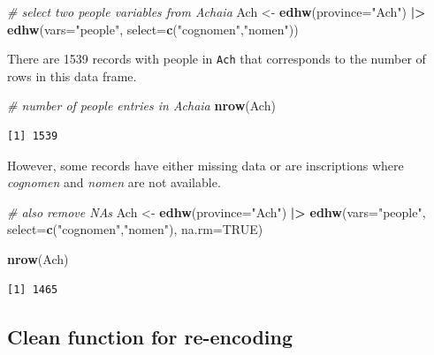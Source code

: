 \documentclass[a4paper,11pt]{memoir}
\newenvironment{Shaded}{\begin{snugshade}}{\end{snugshade}}
\newcommand{\CommentTok}[1]{\textcolor[rgb]{0.56,0.35,0.01}{\textit{#1}}}
\newcommand{\DataTypeTok}[1]{\textcolor[rgb]{0.13,0.29,0.53}{#1}}
\newcommand{\ErrorTok}[1]{\textcolor[rgb]{0.64,0.00,0.00}{\textbf{#1}}}
\newcommand{\KeywordTok}[1]{\textcolor[rgb]{0.13,0.29,0.53}{\textbf{#1}}}
\newcommand{\NormalTok}[1]{#1}
\newcommand{\OperatorTok}[1]{\textcolor[rgb]{0.81,0.36,0.00}{\textbf{#1}}}
\newcommand{\OtherTok}[1]{\textcolor[rgb]{0.56,0.35,0.01}{#1}}
\newcommand{\StringTok}[1]{\textcolor[rgb]{0.31,0.60,0.02}{#1}}
\begin{document}
\begin{Shaded}
\begin{Highlighting}[]
\CommentTok{# select two people variables from Achaia}
\NormalTok{Ach <-}\StringTok{ }\KeywordTok{edhw}\NormalTok{(}\DataTypeTok{province=}\StringTok{"Ach"}\NormalTok{) }\OperatorTok{|}\ErrorTok{>}\StringTok{ }
\StringTok{  }\KeywordTok{edhw}\NormalTok{(}\DataTypeTok{vars=}\StringTok{"people"}\NormalTok{, }\DataTypeTok{select=}\KeywordTok{c}\NormalTok{(}\StringTok{"cognomen"}\NormalTok{,}\StringTok{"nomen"}\NormalTok{))}
\end{Highlighting}
\end{Shaded}

There are 1539 records with people in \texttt{Ach} that corresponds to
the number of rows in this data frame.

\begin{Shaded}
\begin{Highlighting}[]
\CommentTok{# number of people entries in Achaia}
\KeywordTok{nrow}\NormalTok{(Ach)}
\end{Highlighting}
\end{Shaded}

\begin{verbatim}
[1] 1539
\end{verbatim}

However, some records have either missing data or are inscriptions where
\emph{cognomen} and \emph{nomen} are not available.

\begin{Shaded}
\begin{Highlighting}[]
\CommentTok{# also remove NAs}
\NormalTok{Ach <-}\StringTok{ }\KeywordTok{edhw}\NormalTok{(}\DataTypeTok{province=}\StringTok{"Ach"}\NormalTok{) }\OperatorTok{|}\ErrorTok{>}\StringTok{ }
\StringTok{  }\KeywordTok{edhw}\NormalTok{(}\DataTypeTok{vars=}\StringTok{"people"}\NormalTok{, }\DataTypeTok{select=}\KeywordTok{c}\NormalTok{(}\StringTok{"cognomen"}\NormalTok{,}\StringTok{"nomen"}\NormalTok{), }\DataTypeTok{na.rm=}\OtherTok{TRUE}\NormalTok{)}

\KeywordTok{nrow}\NormalTok{(Ach)}
\end{Highlighting}
\end{Shaded}

\begin{verbatim}
[1] 1465
\end{verbatim}

\hypertarget{clean-function-for-re-encoding}{%
\subsection{Clean function for
re-encoding}\label{clean-function-for-re-encoding}}
\end{document}
